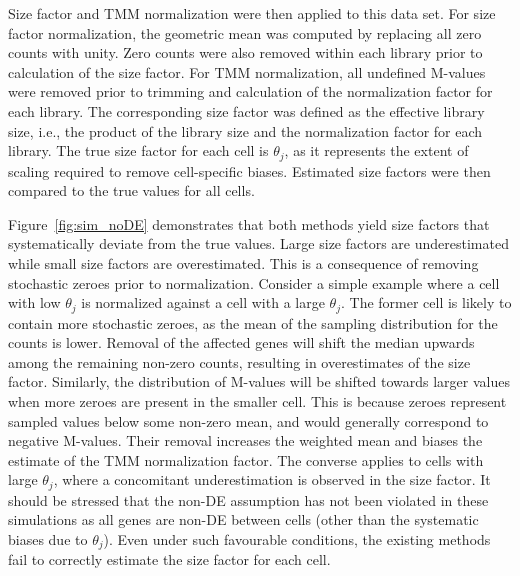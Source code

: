 \documentclass{article}
\begin{document}
Size factor and TMM normalization were then applied to this data set.
For size factor normalization, the geometric mean was computed by replacing all zero counts with unity.
Zero counts were also removed within each library prior to calculation of the size factor.
For TMM normalization, all undefined M-values were removed prior to trimming and calculation of the normalization factor for each library.
The corresponding size factor was defined as the effective library size, i.e., the product of the library size and the normalization factor for each library.
The true size factor for each cell is $\theta_j$, as it represents the extent of scaling required to remove cell-specific biases.
Estimated size factors were then compared to the true values for all cells.

Figure~\ref{fig:sim_noDE} demonstrates that both methods yield size factors that systematically deviate from the true values.
Large size factors are underestimated while small size factors are overestimated.
This is a consequence of removing stochastic zeroes prior to normalization.
Consider a simple example where a cell with low $\theta_j$ is normalized against a cell with a large $\theta_j$. 
The former cell is likely to contain more stochastic zeroes, as the mean of the sampling distribution for the counts is lower.
Removal of the affected genes will shift the median upwards among the remaining non-zero counts, resulting in overestimates of the size factor.
Similarly, the distribution of M-values will be shifted towards larger values when more zeroes are present in the smaller cell.
This is because zeroes represent sampled values below some non-zero mean, and would generally correspond to negative M-values.
Their removal increases the weighted mean and biases the estimate of the TMM normalization factor.
The converse applies to cells with large $\theta_j$, where a concomitant underestimation is observed in the size factor.
It should be stressed that the non-DE assumption has not been violated in these simulations as all genes are non-DE between cells (other than the systematic biases due to $\theta_j$).
Even under such favourable conditions, the existing methods fail to correctly estimate the size factor for each cell.
\end{document}
